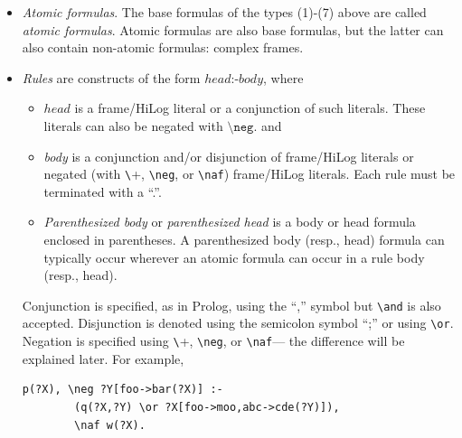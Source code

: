 \documentclass[11pt]{article}
\newcommand{\bs}{\textbackslash}
\newcommand{\PLGNAF}{\mbox{\texttt{\bs}+}\xspace}
\newcommand{\RULELOGNAF}{{\texttt{{\bs}naf}}\xspace}
\newcommand{\RULELOGNEG}{{\texttt{{\bs}neg}}\xspace}
\begin{document}
\begin{itemize}
  Furthermore, in rule bodies and queries,
  frame attribute notation combines with the binary operators
  \texttt{=}, \texttt{\bs{}=}, \texttt{!=}, \texttt{==}, \texttt{\bs{}==},
  \texttt{=\bs=}, \texttt{=:=}, \texttt{!==}, \texttt{:=:},
  \texttt{\bs{}is}, \texttt{>}, \texttt{<}, \texttt{=<}, \texttt{>=},
  \texttt{@<}, \texttt{@>}, \texttt{@=<}, \texttt{@>=}, \texttt{$\sim$},
  \texttt{!$\sim$}, \texttt{\bs{}in}, \texttt{\bs{}subset},
  \texttt{\bs{}sublist{}}.   
  These operators will be introduced as we go, many in
  Section~\ref{sec-arith-expr}, but here is an example of a query where
  some of these operators are rolled into a frame:
\begin{verbatim}
 ?- John[age->?A>30, children->?C != Bob, salary->?X \is 200*7+5000,
         phone->?P \in ['111-222-3456','123-456-7890']].  
\end{verbatim}
  This is a shorthand for
\begin{verbatim}
 ?- John[age->?A,children->?C,salary->?X], ?A>30, ?C!=Bob, ?X \is 200*7+5000.
\end{verbatim}

\item \emph{Atomic formulas}. The base formulas of the types (1)-(7) above
  are called \emph{atomic formulas}.  Atomic formulas are also base formulas,
  but the latter can also contain non-atomic formulas: complex frames.
  
\item \emph{Rules} are constructs of the form $head \texttt{:-} 
  body$, where
  \begin{itemize}
  \item $head$ is a frame/HiLog literal or a conjunction of such literals.
    These literals can also be negated with $\RULELOGNEG$.
    and
  \item \emph{body} is a conjunction and/or disjunction
    of frame/HiLog literals or negated (with \PLGNAF, \RULELOGNEG, or
    \RULELOGNAF) frame/HiLog literals.
  Each rule must be terminated with a ``.''.
  \item \emph{Parenthesized body} or \emph{parenthesized head}     
    is a body or head formula enclosed in parentheses.
    A parenthesized body (resp., head) formula can typically occur wherever
    an atomic formula can occur in a rule body (resp., head).
  \end{itemize}
  Conjunction is specified, as in Prolog, using the ``,'' symbol but
  \texttt{\bs{}and} is also accepted. Disjunction is denoted
  using the semicolon symbol ``;'' or using \texttt{\bs{}or}.
  Negation is specified using \PLGNAF, \RULELOGNEG,
  or \RULELOGNAF --- the difference will be explained later.
  For example,
\begin{verbatim}
p(?X), \neg ?Y[foo->bar(?X)] :-
        (q(?X,?Y) \or ?X[foo->moo,abc->cde(?Y)]),
        \naf w(?X).
\end{verbatim}


\end{itemize}
\end{document}
